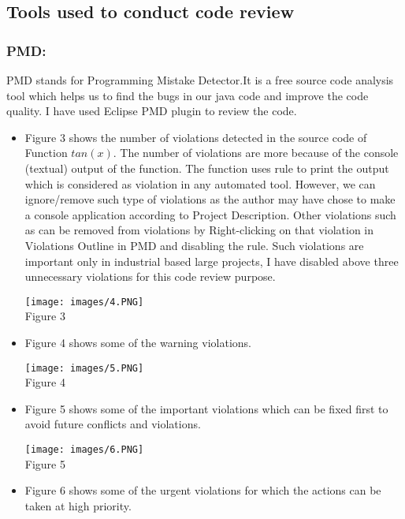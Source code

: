 \documentclass[10pt,letterpaper]{article}
\begin{document}
\subsection{Tools used to conduct code review}
\subsubsection{PMD:}
PMD stands for Programming Mistake Detector.It is a free source code analysis tool which helps us to find the bugs in our java code and improve the code quality. I have used Eclipse PMD plugin to review the code.
\begin{itemize}
    \item Figure 3 shows the number of violations detected in the source code of Function $tan(x)$. The number of violations are more because of the console (textual) output of the function. The function uses  rule to print the output which is considered as violation in any automated tool. However, we can ignore/remove such type of violations as the author may have chose to make a console application according to Project Description. Other violations such as  can be removed from violations by Right-clicking on that violation in Violations Outline in PMD and disabling the rule. Such violations are important only in industrial based large projects, I have disabled above three unnecessary violations for this code review purpose.
\begin{center}
    \texttt{[image: images/4.PNG]}\\
  \caption{Figure 3}
\end{center} 
    \item Figure 4 shows some of the warning violations. 
    \begin{center}
    \texttt{[image: images/5.PNG]}\\
  \caption{Figure 4}
\end{center} 
\item Figure 5 shows some of the important violations which can be fixed first to avoid future conflicts and violations.  
    \begin{center}
    \texttt{[image: images/6.PNG]}\\
  \caption{Figure 5}
\end{center}
\item Figure 6 shows some of the urgent violations for which the actions can be taken at high priority.  

\end{itemize}
\end{document}
